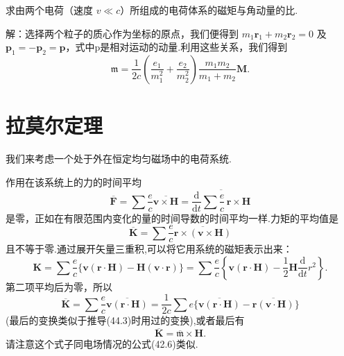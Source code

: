 \begin{xiti}

\quad 求由两个电荷（速度 $v\ll c$）所组成的电荷体系的磁矩与角动量的比.

解：选择两个粒子的质心作为坐标的原点，我们便得到 $m_1\boldsymbol{r}_1+m_2\boldsymbol{r}_2=0$ 及 $\boldsymbol{p}_1=-\boldsymbol{p}_2=\boldsymbol{p}$，式中p是相对运动的动量.利用这些关系，我们得到
\begin{equation*}
  \mathfrak{m}
  =\frac{1}{2c}\left(\frac{e_1}{m_1^2}+\frac{e_2}{m_2^2}\right)
  \frac{m_1m_2}{m_1+m_2}\boldsymbol{M}.
\end{equation*}

\end{xiti}

\section{拉莫尔定理}

我们来考虑一个处于外在恒定均匀磁场中的电荷系统.

作用在该系统上的力的时间平均
\begin{equation*}
  \overline{\boldsymbol{F}}
  =\sum\frac{e}{c}\overline{\boldsymbol{v}\times\boldsymbol{H}}
  =\overline{\frac{\mathrm{d}}{\mathrm{d}t}\sum\frac{e}{c}\,\boldsymbol{r}\times\boldsymbol{H}}
\end{equation*}
是零，正如在有限范围内变化的量的时间导数的时间平均一样.力矩的平均值是
\begin{equation*}
  \overline{\boldsymbol{K}}
  =\sum\frac{e}{c}\overline{\boldsymbol{r}\times(\boldsymbol{v}\times\boldsymbol{H})}
\end{equation*}
且不等于零.通过展开矢量三重积,可以将它用系统的磁矩表示出来：
\begin{equation*}
  \boldsymbol{K}
  =\sum\frac{e}{c}\{\boldsymbol{v}(\boldsymbol{r}\cdot\boldsymbol{H})
  -\boldsymbol{H}(\boldsymbol{v}\cdot\boldsymbol{r})\}
  =\sum\frac{e}{c}\left\{\boldsymbol{v}(\boldsymbol{r}\cdot\boldsymbol{H})
  -\frac{1}{2}\boldsymbol{H}\frac{\mathrm{d}}{\mathrm{d}t}r^2\right\}.
\end{equation*}
第二项平均后为零，所以
\begin{equation*}
  \overline{\boldsymbol{K}}
  =\sum\frac{e}{c}\overline{\boldsymbol{v}(\boldsymbol{r}\cdot\boldsymbol{H})}
  =\frac{1}{2c}\sum e\{\overline{\boldsymbol{v}(\boldsymbol{r}\cdot\boldsymbol{H})}
  -\overline{\boldsymbol{r}(\boldsymbol{v}\cdot\boldsymbol{H})}\}
\end{equation*}
(最后的变换类似于推导(44.3)时用过的变换),或者最后有
\begin{equation}
  \overline{\boldsymbol{K}}=\overline{\mathfrak{m}}\times\boldsymbol{H}.
\end{equation}
请注意这个式子同电场情况的公式(42.6)类似.

